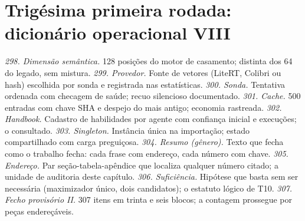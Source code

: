 \section{Trigésima primeira rodada: dicionário operacional VIII}
\textit{298. Dimensão semântica.} 128 posições do motor de casamento; distinta dos 64 do legado, sem mistura.
\textit{299. Provedor.} Fonte de vetores (LiteRT, Colibri ou hash) escolhida por sonda e registrada nas estatísticas.
\textit{300. Sonda.} Tentativa ordenada com checagem de saúde; recuo silencioso documentado.
\textit{301. Cache.} 500 entradas com chave SHA e despejo do mais antigo; economia rastreada.
\textit{302. Handbook.} Cadastro de habilidades por agente com confiança inicial e execuções; o consultado.
\textit{303. Singleton.} Instância única na importação; estado compartilhado com carga preguiçosa.
\textit{304. Resumo (gênero).} Texto que fecha como o trabalho fecha: cada frase com endereço, cada número com chave.
\textit{305. Endereço.} Par seção-tabela-apêndice que localiza qualquer número citado; a unidade de auditoria deste capítulo.
\textit{306. Suficiência.} Hipótese que basta sem ser necessária (maximizador único, dois candidatos); o estatuto lógico de T10.
\textit{307. Fecho provisório II.} 307 itens em trinta e seis blocos; a contagem prossegue por peças endereçáveis.
